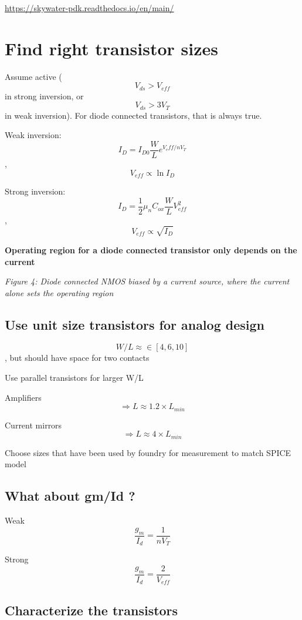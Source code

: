\url{https://skywater-pdk.readthedocs.io/en/main/}

\section{Find right transistor sizes}\label{find-right-transistor-sizes}

Assume active (\[V_{ds} > V_{eff}\] in strong inversion, or
\[V_{ds} > 3 V_T\] in weak inversion). For diode connected transistors,
that is always true.

Weak inversion: \[ I_{D} = I_{D0} \frac{W}{L} e^{V_eff / n V_T} \],
\[V_{eff} \propto \ln{I_D} \]

Strong inversion:
\[ I_{D} = \frac{1}{2} \mu_n C_{ox} \frac{W}{L} V_{eff}^2\],
\[V_{eff} \propto \sqrt{I_D} \]

\textbf{Operating region for a diode connected transistor only depends
on the current}


{
\centering
{}
}

\emph{Figure 4: Diode connected NMOS biased by a current source, where
the current alone sets the operating region}

\subsection{Use unit size transistors for analog
design}\label{use-unit-size-transistors-for-analog-design}

\[ W/L \approx \in[4, 6, 10] \], but should have space for two contacts

Use parallel transistors for larger W/L

Amplifiers \[\Rightarrow L \approx 1.2 \times L_{min} \]

Current mirrors \[\Rightarrow L \approx 4 \times L_{min} \]

Choose sizes that have been used by foundry for measurement to match
SPICE model

\subsection{What about gm/Id ?}\label{what-about-gmid}

Weak \[ \frac{g_m}{I_d} = \frac{1}{nV_T}\]

Strong \[ \frac{g_m}{I_d} = \frac{2}{V_{eff}}\]

\subsection{Characterize the
transistors}\label{characterize-the-transistors}

